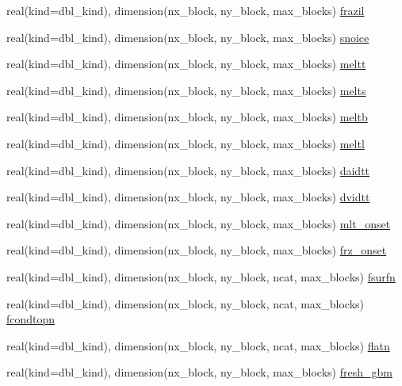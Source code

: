 \begin{DoxyCompactItemize}
real(kind=dbl\_\-kind), dimension(nx\_\-block, ny\_\-block, max\_\-blocks) \hyperlink{namespaceice__flux_a5e63c63db5a472f4041fc150316b8c67}{frazil}
\item 
real(kind=dbl\_\-kind), dimension(nx\_\-block, ny\_\-block, max\_\-blocks) \hyperlink{namespaceice__flux_a081cc6f264496624fb6bce9e69e74d9c}{snoice}
\item 
real(kind=dbl\_\-kind), dimension(nx\_\-block, ny\_\-block, max\_\-blocks) \hyperlink{namespaceice__flux_aa99daffd05f84f37a6036ce5901100af}{meltt}
\item 
real(kind=dbl\_\-kind), dimension(nx\_\-block, ny\_\-block, max\_\-blocks) \hyperlink{namespaceice__flux_aae0e112fe38b436d979dc7fe86cdcb8f}{melts}
\item 
real(kind=dbl\_\-kind), dimension(nx\_\-block, ny\_\-block, max\_\-blocks) \hyperlink{namespaceice__flux_acdba57f616cfb780f910b8214a5b6121}{meltb}
\item 
real(kind=dbl\_\-kind), dimension(nx\_\-block, ny\_\-block, max\_\-blocks) \hyperlink{namespaceice__flux_a6aafbe05e11bff91bc937c605cf9d121}{meltl}
\item 
real(kind=dbl\_\-kind), dimension(nx\_\-block, ny\_\-block, max\_\-blocks) \hyperlink{namespaceice__flux_aff988ec903f1e7908e7b8a176ea792ed}{daidtt}
\item 
real(kind=dbl\_\-kind), dimension(nx\_\-block, ny\_\-block, max\_\-blocks) \hyperlink{namespaceice__flux_a7c8b98f21bf9431f5d2a10d6643f0752}{dvidtt}
\item 
real(kind=dbl\_\-kind), dimension(nx\_\-block, ny\_\-block, max\_\-blocks) \hyperlink{namespaceice__flux_a9f86616260452938fcc37213fcb284f8}{mlt\_\-onset}
\item 
real(kind=dbl\_\-kind), dimension(nx\_\-block, ny\_\-block, max\_\-blocks) \hyperlink{namespaceice__flux_aa58df919e95f30bf2b824e6585dbd9e5}{frz\_\-onset}
\item 
real(kind=dbl\_\-kind), dimension(nx\_\-block, ny\_\-block, ncat, max\_\-blocks) \hyperlink{namespaceice__flux_aa05e0fe10c9628c94efe017d79f0cd1e}{fsurfn}
\item 
real(kind=dbl\_\-kind), dimension(nx\_\-block, ny\_\-block, ncat, max\_\-blocks) \hyperlink{namespaceice__flux_a0f22ed9bcb531d5ea26305f27ed19d05}{fcondtopn}
\item 
real(kind=dbl\_\-kind), dimension(nx\_\-block, ny\_\-block, ncat, max\_\-blocks) \hyperlink{namespaceice__flux_a43363f554cd27a966c89394ce573135e}{flatn}
\item 
real(kind=dbl\_\-kind), dimension(nx\_\-block, ny\_\-block, max\_\-blocks) \hyperlink{namespaceice__flux_a962d1e42294e09b10fb22bc3554aa71b}{fresh\_\-gbm}

\end{DoxyCompactItemize}
